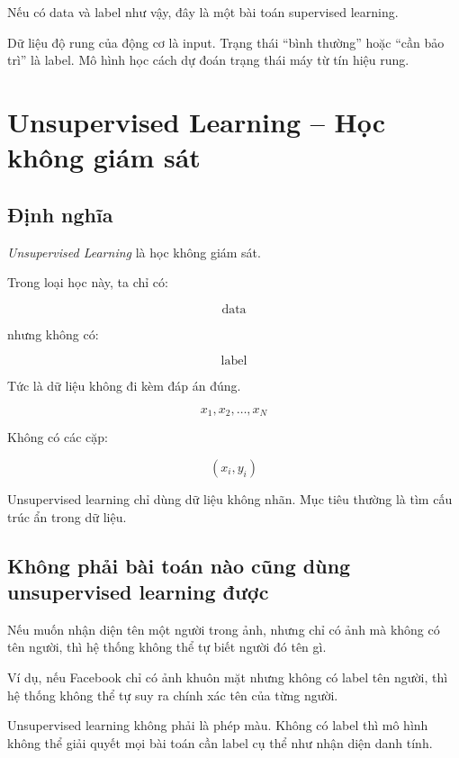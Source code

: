 Nếu có data và label như vậy, đây là một bài toán supervised learning.

\begin{vidu}
Dữ liệu độ rung của động cơ là input. Trạng thái ``bình thường'' hoặc ``cần bảo trì'' là label. Mô hình học cách dự đoán trạng thái máy từ tín hiệu rung.
\end{vidu}

\section{Unsupervised Learning -- Học không giám sát}

\subsection{Định nghĩa}

\textit{Unsupervised Learning} là học không giám sát.

Trong loại học này, ta chỉ có:

\[
    \text{data}
\]

nhưng không có:

\[
    \text{label}
\]

Tức là dữ liệu không đi kèm đáp án đúng.

\[
    x_1,x_2,\ldots,x_N
\]

Không có các cặp:

\[
    (x_i,y_i)
\]

\begin{ghinho}
Unsupervised learning chỉ dùng dữ liệu không nhãn. Mục tiêu thường là tìm cấu trúc ẩn trong dữ liệu.
\end{ghinho}

\subsection{Không phải bài toán nào cũng dùng unsupervised learning được}

Nếu muốn nhận diện tên một người trong ảnh, nhưng chỉ có ảnh mà không có tên người, thì hệ thống không thể tự biết người đó tên gì.

Ví dụ, nếu Facebook chỉ có ảnh khuôn mặt nhưng không có label tên người, thì hệ thống không thể tự suy ra chính xác tên của từng người.

\begin{canhbao}
Unsupervised learning không phải là phép màu. Không có label thì mô hình không thể giải quyết mọi bài toán cần label cụ thể như nhận diện danh tính.
\end{canhbao}

